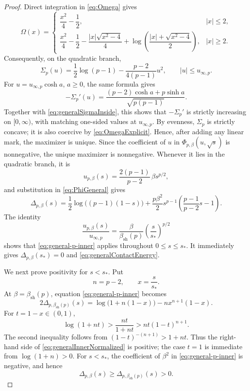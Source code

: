 \documentclass[10pt,a4paper]{amsart}
\newcommand{\Om}{\Omega}
\begin{document}
\begin{proof}
Direct integration in \eqref{eq:Omega} gives
\begin{equation}\label{eq:OmegaExplicit}
 \Om(x)=
 \begin{cases}
  \dfrac{x^2}{4}-\dfrac12, & |x|\leq2,\\[6pt]
  \dfrac{x^2}{4}-\dfrac12-
  \dfrac{|x|\sqrt{x^2-4}}{4}
  +\log\!\left(\dfrac{|x|+\sqrt{x^2-4}}2\right), & |x|\geq2.
 \end{cases}
\end{equation}
Consequently, on the quadratic branch,
\begin{equation}\label{eq:generalSigmaInside}
 \Sigma_p(u)
 =\frac12\log(p-1)-\frac{p-2}{4(p-1)}u^2,
 \qquad |u|\leq u_{\infty,p}.
\end{equation}
For \(u=u_{\infty,p}\cosh a\), \(a\geq0\), the same formula gives
\[
 -\Sigma_p'(u)
 =\frac{(p-2)\cosh a+p\sinh a}{\sqrt{p(p-1)}}.
\]
Together with \eqref{eq:generalSigmaInside}, this shows that
\(-\Sigma_p'\) is strictly increasing on \([0,\infty)\), with matching
one-sided values at \(u_{\infty,p}\).  By evenness, \(\Sigma_p\) is
strictly concave; it is also coercive by \eqref{eq:OmegaExplicit}.
Hence, after adding any linear mark, the maximizer is unique.
Since the coefficient of \(u\) in \(\Phi_{p,\beta}(u,\sqrt s)\) is
nonnegative, the unique maximizer is nonnegative.  Whenever it lies in
the quadratic branch, it is
\begin{equation}\label{eq:generalInnerOptimizer}
 u_{p,\beta}(s)
 =\frac{2(p-1)}{p-2}\,\beta s^{p/2},
\end{equation}
and substitution in \eqref{eq:PhiGeneral} gives
\begin{equation}\label{eq:general-p-inner}
 \Delta_{p,\beta}(s)
 =\frac12\log\bigl((p-1)(1-s)\bigr)
 +\frac{p\beta^2}{2}s^{p-1}
  \left(\frac{p-1}{p-2}s-1\right).
\end{equation}
The identity
\begin{equation}\label{eq:optimizerEdgeRatio}
 \frac{u_{p,\beta}(s)}{u_{\infty,p}}
 =\frac{\beta}{\beta_{\mathrm{sh}}(p)}
  \left(\frac{s}{s_*}\right)^{p/2}
\end{equation}
shows that \eqref{eq:general-p-inner} applies throughout
\(0\leq s\leq s_*\).  It immediately gives
\(\Delta_{p,\beta}(s_*)=0\) and \eqref{eq:generalContactEnergy}.

We next prove positivity for \(s<s_*\).  Put
\[
 n=p-2,
 \qquad
 x=\frac{s}{s_*}.
\]
At \(\beta=\beta_{\mathrm{sh}}(p)\), equation
\eqref{eq:general-p-inner} becomes
\begin{equation}\label{eq:generalInnerNormalized}
 2\Delta_{p,\beta_{\mathrm{sh}}(p)}(s)
 =\log\bigl(1+n(1-x)\bigr)-nx^{n+1}(1-x).
\end{equation}
For \(t=1-x\in(0,1)\),
\[
 \log(1+nt)>\frac{nt}{1+nt}>nt(1-t)^{n+1}.
\]
The second inequality follows from
\((1-t)^{-(n+1)}>1+nt\).  Thus the right-hand side of
\eqref{eq:generalInnerNormalized} is positive; the case \(t=1\) is
immediate from \(\log(1+n)>0\).  For \(s<s_*\), the
coefficient of \(\beta^2\) in \eqref{eq:general-p-inner} is negative,
and hence
\[
 \Delta_{p,\beta}(s)
 \geq\Delta_{p,\beta_{\mathrm{sh}}(p)}(s)>0.
\]


\end{proof}
\end{document}
